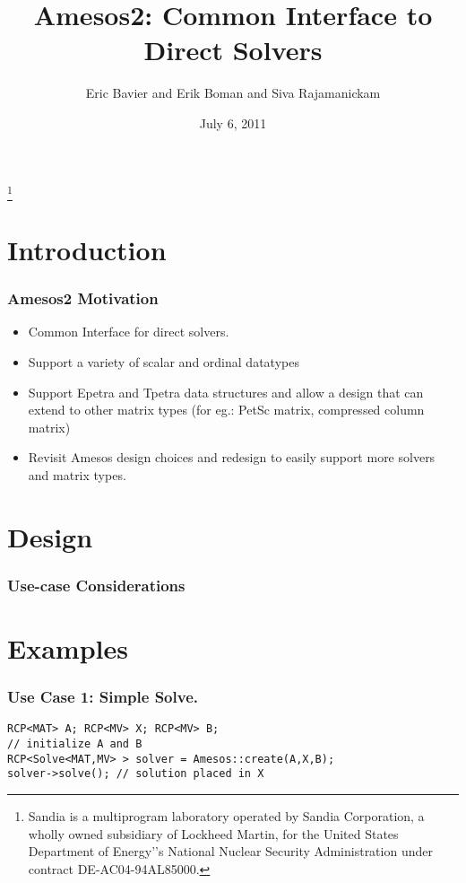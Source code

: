 \documentclass[xcolor=dvipsnames]{beamer}
\title[Amesos2]{Amesos2: Common Interface to Direct Solvers}
\author[Bavier, Boman, Rajamanickam]{Eric Bavier and Erik Boman and Siva Rajamanickam}
\institute[]{
Sandia National Laboratories
}
\date[]{July 6, 2011}
\begin{document}
\begin{frame}[plain]
  \titlepage
  \footnote{\tiny{Sandia is a multiprogram laboratory operated by Sandia Corporation, a wholly owned subsidiary of Lockheed Martin, for the United States Department of Energy'’s National Nuclear Security Administration under contract DE-AC04-94AL85000.}}
\end{frame}

\section{Introduction}

\begin{frame}
  \frametitle{Amesos2 Motivation}
  
  \begin{itemize}
  \item Common Interface for direct solvers.
    \medskip
  \item Support a variety of scalar and ordinal datatypes
    \medskip
  \item Support Epetra and Tpetra data structures and allow a design that can
    extend to other matrix types (for eg.: PetSc matrix, compressed column
    matrix)
    \medskip
  \item Revisit Amesos design choices and redesign to easily support more
    solvers and matrix types.
  \end{itemize}
    
\end{frame}

\section{Design}

\begin{frame}
  \frametitle{Use-case Considerations}
\end{frame}

\section{Examples}

\begin{frame}[fragile]          %
  \frametitle{Use Case 1: Simple Solve.}
  \begin{lstlisting}
RCP<MAT> A; RCP<MV> X; RCP<MV> B;
// initialize A and B
RCP<Solve<MAT,MV> > solver = Amesos::create(A,X,B);
solver->solve(); // solution placed in X
  \end{lstlisting}
\end{frame}
\end{document}
